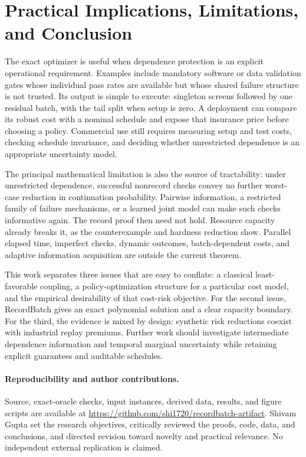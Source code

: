 \documentclass[runningheads]{llncs}
\begin{document}
\section{Practical Implications, Limitations, and Conclusion}
The exact optimizer is useful when dependence protection is an explicit
operational requirement. Examples include mandatory software or data
validation gates whose individual pass rates are available but whose shared
failure structure is not trusted. Its output is simple to execute: singleton screens followed by one residual
batch, with the tail split when setup is zero. A deployment can
compare its robust cost with a nominal schedule and expose that insurance
price before choosing a policy. Commercial use still requires measuring
setup and test costs, checking schedule invariance, and deciding whether
unrestricted dependence is an appropriate uncertainty model.

The principal mathematical limitation is also the source of tractability:
under unrestricted dependence, successful nonrecord checks convey no further
worst-case reduction in continuation probability. Pairwise information, a
restricted family of failure mechanisms, or a learned joint model can make
such checks informative again. The record proof then need not hold.
Resource capacity already breaks it, as the counterexample and hardness
reduction show. Parallel elapsed time, imperfect checks, dynamic outcomes,
batch-dependent costs, and adaptive information acquisition are outside the
current theorem.

This work separates three issues that are easy to conflate: a classical
least-favorable coupling, a policy-optimization structure for a particular
cost model, and the empirical desirability of that cost-risk objective.
For the second issue, RecordBatch gives an exact polynomial solution and a
clear capacity boundary. For the third, the evidence is mixed by design:
synthetic risk reductions coexist with industrial replay premiums.
Further work should investigate intermediate dependence information and
temporal marginal uncertainty while retaining explicit guarantees and
auditable schedules.

\paragraph{Reproducibility and author contributions.}
Source, exact-oracle checks, input instances, derived data, results, and figure
scripts are available at \url{https://github.com/shi1720/recordbatch-artifact}.
Shivam Gupta set the research objectives, critically reviewed the proofs,
code, data, and conclusions, and directed revision toward novelty and practical
relevance. No independent external replication is claimed.
\end{document}
